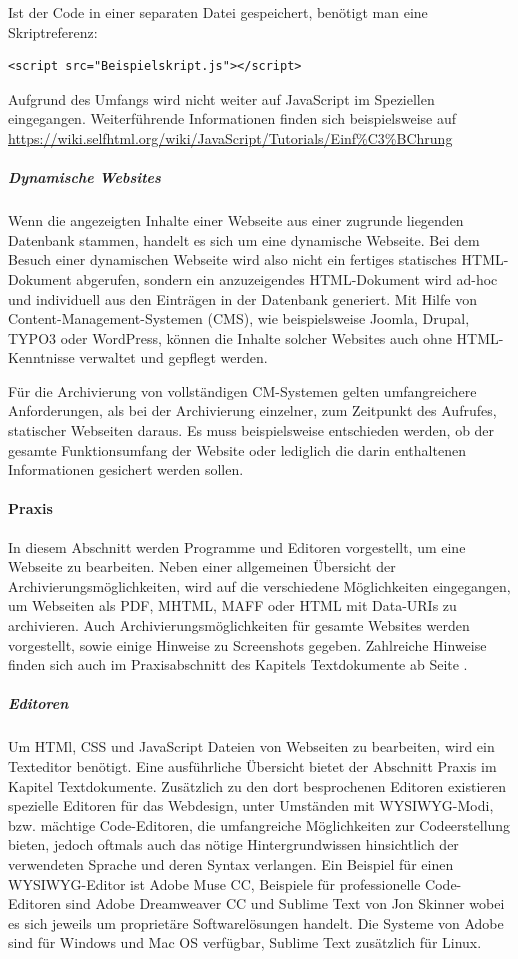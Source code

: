 Ist der Code in einer separaten Datei gespeichert, benötigt man eine Skriptreferenz: 
\lstset{language=HTML}
\begin{lstlisting}[frame=L, xleftmargin=1.5\parindent, rulecolor=\color{ianusGrau}]
<script src="Beispielskript.js"></script>
\end{lstlisting}

Aufgrund des Umfangs wird nicht weiter auf JavaScript im Speziellen eingegangen. Weiterführende Informationen finden sich beispielsweise auf \url{https://wiki.selfhtml.org/wiki/JavaScript/Tutorials/Einf\%C3\%BChrung}


\subparagraph{Dynamische Websites}
Wenn die angezeigten Inhalte einer Webseite aus einer zugrunde liegenden Datenbank stammen, handelt es sich um eine dynamische Webseite. Bei dem Besuch einer dynamischen  Webseite wird also nicht ein fertiges statisches HTML-Dokument abgerufen, sondern ein anzuzeigendes HTML-Dokument wird ad-hoc und individuell aus den Einträgen in der Datenbank generiert. Mit Hilfe von Content-Management-Systemen (CMS), wie beispielsweise Joomla, Drupal, TYPO3 oder WordPress, können die Inhalte solcher Websites auch ohne HTML-Kenntnisse verwaltet und gepflegt werden.

Für die Archivierung von vollständigen CM-Systemen gelten umfangreichere Anforderungen, als bei der Archivierung einzelner, zum Zeitpunkt des Aufrufes, statischer Webseiten daraus. Es muss beispielsweise entschieden werden, ob der gesamte Funktionsumfang der Website oder lediglich die darin enthaltenen Informationen gesichert werden sollen.


\paragraph{Praxis} 
In diesem Abschnitt werden Programme und Editoren vorgestellt, um eine Webseite zu bearbeiten.  Neben einer allgemeinen Übersicht der Archivierungsmöglichkeiten, wird auf die verschiedene Möglichkeiten eingegangen, um Webseiten als PDF, MHTML, MAFF oder HTML mit Data-URIs zu archivieren. Auch Archivierungsmöglichkeiten für gesamte Websites werden vorgestellt, sowie einige Hinweise zu Screenshots gegeben. Zahlreiche Hinweise finden sich auch im Praxisabschnitt des Kapitels Textdokumente ab Seite \pageref{textdokumente}.

\subparagraph{Editoren}
Um HTMl, CSS und JavaScript Dateien von Webseiten zu bearbeiten, wird ein Texteditor benötigt. Eine ausführliche Übersicht bietet der Abschnitt Praxis im Kapitel Textdokumente. Zusätzlich zu den dort besprochenen Editoren existieren spezielle Editoren für das Webdesign, unter Umständen mit WYSIWYG-Modi, bzw. mächtige Code-Editoren, die umfangreiche Möglichkeiten zur Codeerstellung bieten, jedoch oftmals auch das nötige Hintergrundwissen hinsichtlich der verwendeten Sprache und deren Syntax verlangen. Ein Beispiel für einen WYSIWYG-Editor ist Adobe Muse CC, Beispiele für professionelle Code-Editoren sind Adobe Dreamweaver CC und Sublime Text von Jon Skinner wobei es sich jeweils um proprietäre Softwarelösungen handelt. Die Systeme von Adobe sind für Windows und Mac OS verfügbar, Sublime Text zusätzlich für Linux. 


